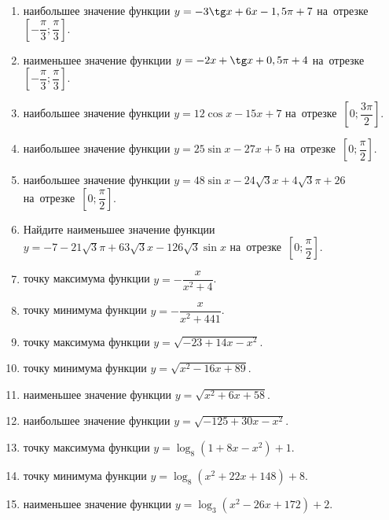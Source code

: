 \documentclass[a4paper,10pt]{article}
\begin{document}
\begin{enumerate}
\item {} наибольшее значение функции $y=-3\tg x +6x-1,5\pi +7$ на~отрезке~$\left[-\dfrac{\pi}{3};\dfrac{\pi}{3}\right]$.

\item {} наименьшее значение функции $y=-2x +\tg x+0,5\pi+4$ на~отрезке~$\left[-\dfrac{\pi}{3};\dfrac{\pi}{3}\right]$.

\item {} наибольшее значение функции $y=12\cos x-15x+7$ на~отрезке~$\left[0;\dfrac{3\pi}{2}\right]$.

\item {} наибольшее значение функции $y=25\sin x-27x+5$ на~отрезке~$\left[0;\dfrac{\pi}{2}\right]$.

\item {} наибольшее значение функции $y=48\sin x-24\sqrt{3}x+4\sqrt{3}\pi +26$ на~отрезке~$\left[0;\dfrac{\pi}{2}\right]$.

\item Найдите наименьшее значение функции $y=-7-21\sqrt{3}\pi+63\sqrt{3}x-126\sqrt{3}\sin x$ на~отрезке~$\left[0;\dfrac{\pi}{2}\right]$.

\item {} точку максимума функции $y=-\dfrac{x}{ x^2 +4}$.

\item {} точку минимума функции $y=-\dfrac{x}{ x^2 +441}$.

\item {} точку максимума функции $y=\sqrt{-23+14x-x^2}$.

\item {} точку минимума функции $y=\sqrt{x^2-16x+89}$.

\item {} наименьшее значение функции $y=\sqrt{x^2+6x+58}$.

\item {} наибольшее значение функции $y=\sqrt{-125+30x-x^2}$.

\item {} точку максимума функции $y=\log_8\left(1+8x-x^2\right)+1$.

\item {} точку минимума функции $y=\log_8\left(x^2+22x+148\right)+8$.

\item {} наименьшее значение функции $y=\log_3\left(x^2-26x+172\right)+2$.


\end{enumerate}
\end{document}
